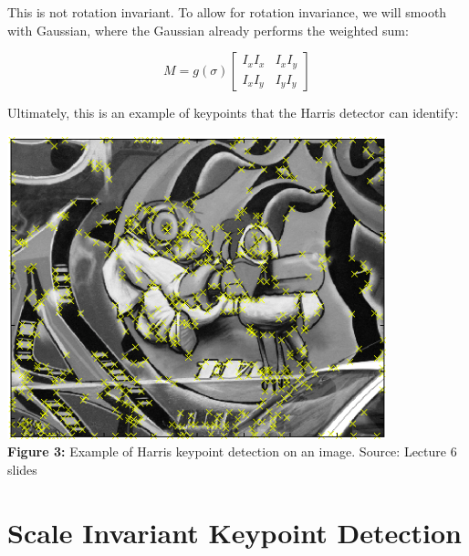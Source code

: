 \documentclass{article}
\begin{document}
This is not rotation invariant. To allow for rotation invariance, we will smooth with Gaussian, where the Gaussian already performs the weighted sum:

\[M =
g( \sigma )
  \begin{bmatrix}
      I_x I_x & I_x I_y\\
      I_x I_y & I_y I_y
    \end{bmatrix}
\]

Ultimately, this is an example of keypoints that the Harris detector can identify:
\begin{center}
	\includegraphics[scale=0.5]{harris_response.png}\\
    \textbf{Figure 3:} Example of Harris keypoint detection on an image. Source: Lecture 6 slides \\
\end{center}

\section{Scale Invariant Keypoint Detection}
\end{document}
